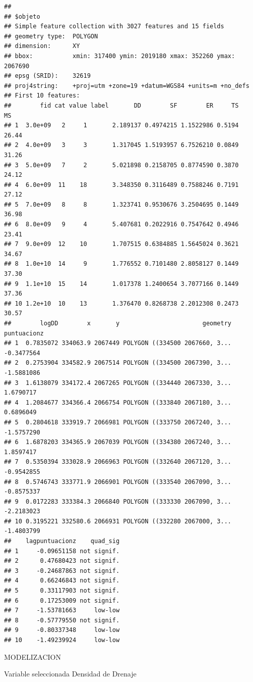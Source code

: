 \documentclass[11pt,]{article}
\begin{document}
\begin{verbatim}
## 
## $objeto
## Simple feature collection with 3027 features and 15 fields
## geometry type:  POLYGON
## dimension:      XY
## bbox:           xmin: 317400 ymin: 2019180 xmax: 352260 ymax: 2067690
## epsg (SRID):    32619
## proj4string:    +proj=utm +zone=19 +datum=WGS84 +units=m +no_defs
## First 10 features:
##        fid cat value label       DD        SF        ER     TS    MS
## 1  3.0e+09   2     1       2.189137 0.4974215 1.1522986 0.5194 26.44
## 2  4.0e+09   3     3       1.317045 1.5193957 6.7526210 0.0849 31.26
## 3  5.0e+09   7     2       5.021898 0.2158705 0.8774590 0.3870 24.12
## 4  6.0e+09  11    18       3.348350 0.3116489 0.7588246 0.7191 27.12
## 5  7.0e+09   8     8       1.323741 0.9530676 3.2504695 0.1449 36.98
## 6  8.0e+09   9     4       5.407681 0.2022916 0.7547642 0.4946 23.41
## 7  9.0e+09  12    10       1.707515 0.6384885 1.5645024 0.3621 34.67
## 8  1.0e+10  14     9       1.776552 0.7101480 2.8058127 0.1449 37.30
## 9  1.1e+10  15    14       1.017378 1.2400654 3.7077166 0.1449 37.36
## 10 1.2e+10  10    13       1.376470 0.8268738 2.2012308 0.2473 30.57
##        logDD        x       y                       geometry puntuacionz
## 1  0.7835072 334063.9 2067449 POLYGON ((334500 2067660, 3...  -0.3477564
## 2  0.2753904 334582.9 2067514 POLYGON ((334500 2067390, 3...  -1.5881086
## 3  1.6138079 334172.4 2067265 POLYGON ((334440 2067330, 3...   1.6790717
## 4  1.2084677 334366.4 2066754 POLYGON ((333840 2067180, 3...   0.6896049
## 5  0.2804618 333919.7 2066981 POLYGON ((333750 2067240, 3...  -1.5757290
## 6  1.6878203 334365.9 2067039 POLYGON ((334380 2067240, 3...   1.8597417
## 7  0.5350394 333028.9 2066963 POLYGON ((332640 2067120, 3...  -0.9542855
## 8  0.5746743 333771.9 2066901 POLYGON ((333540 2067090, 3...  -0.8575337
## 9  0.0172283 333384.3 2066840 POLYGON ((333330 2067090, 3...  -2.2183023
## 10 0.3195221 332580.6 2066931 POLYGON ((332280 2067000, 3...  -1.4803799
##    lagpuntuacionz    quad_sig
## 1     -0.09651158 not signif.
## 2      0.47680423 not signif.
## 3     -0.24687863 not signif.
## 4      0.66246843 not signif.
## 5      0.33117903 not signif.
## 6      0.17253009 not signif.
## 7     -1.53781663     low-low
## 8     -0.57779550 not signif.
## 9     -0.80337348     low-low
## 10    -1.49239924     low-low
\end{verbatim}

MODELIZACION

Variable seleccionada Densidad de Drenaje
\end{document}
